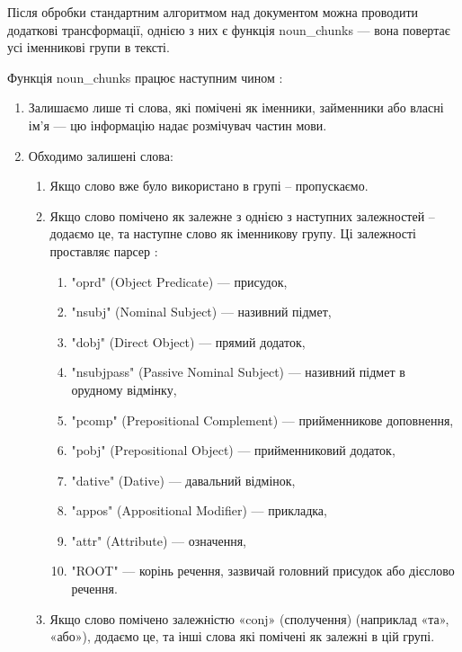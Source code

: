 \documentclass[14pt]{extarticle}
\begin{document}
  Після обробки стандартним алгоритмом над документом можна проводити додаткові
  трансформації, однією з них є функція noun\_chunks
  \cite{spacy_noun_chunks} ---
  вона повертає усі іменникові групи \cite{wiki_noun_phrase} в тексті.

  Функція noun\_chunks працює наступним чином \cite{wiki_noun_chunks_impl}:

  \begin{enumerate}[labelindent=\dimexpr\parindent*2\relax, leftmargin=*]
    \item Залишаємо лише ті слова, які помічені як іменники,
      займенники або власні ім'я --- цю інформацію надає розмічувач частин мови.
    \item Обходимо залишені слова:
    \begin{enumerate}
      \item Якщо слово вже було використано в групі -- пропускаємо.
      \item Якщо слово помічено як залежне з однією з наступних залежностей -- додаємо це, та наступне слово як іменникову групу.
        Ці залежності проставляє парсер \cite{spacy_label_scheme}:
        \begin{enumerate}
          \item "oprd" (Object Predicate) \cite{wiki_predicate_grammar} ---
            присудок,
          \item "nsubj" (Nominal Subject) \cite{nsubj_dep} --- називний підмет,
          \item "dobj" (Direct Object) \cite{wiki_dobj} --- прямий додаток,
          \item "nsubjpass" (Passive Nominal Subject) \cite{nsubj_pass_dep} ---
            називний підмет в орудному відмінку,
          \item "pcomp" (Prepositional Complement)
            \cite{wiki_prepositional_phrases} --- прийменникове доповнення,
          \item "pobj" (Prepositional Object) --- прийменниковий додаток,
          \item "dative" (Dative) \cite{wiki_dative} --- давальний відмінок,
          \item "appos" (Appositional Modifier) \cite{appos_dep} --- прикладка,
          \item "attr" (Attribute) \cite{wiki_grammatical_modifier} ---
            означення,
          \item "ROOT" \cite{root_dep} --- корінь речення,
            зазвичай головний присудок або дієслово речення.
        \end{enumerate}
     \item Якщо слово помічено залежністю «conj» (сполучення)
       \cite{wiki_conjunction, conj_dep}
       (наприклад «та», «або»),
       додаємо це, та інші слова які помічені як залежні в цій групі.
    \end{enumerate}
  \end{enumerate}
\end{document}
